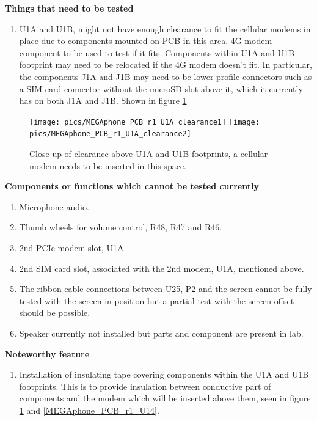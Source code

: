 \textbf{Things that need to be tested}
\begin{enumerate}
\item U1A and U1B, might not have enough clearance to fit the cellular modems in place due to components mounted on PCB in this area. 4G modem component to be used to test if it fits. Components within U1A and U1B footprint may need to be relocated if the 4G modem doesn't fit. In particular, the components J1A and J1B may need to be lower profile connectors such as a SIM card connector without the microSD slot above it, which it currently has on both J1A and J1B. Shown in figure \ref{MEGAphone_PCB_r1_U1A_clearance} \\
\end{enumerate}

\begin{figure} \begin{center}
\texttt{[image: pics/MEGAphone\_PCB\_r1\_U1A\_clearance1]}
\texttt{[image: pics/MEGAphone\_PCB\_r1\_U1A\_clearance2]}
\end{center} 
\caption{Close up of clearance above U1A and U1B footprints, a cellular modem needs to be inserted in this space. \\}
\label{MEGAphone_PCB_r1_U1A_clearance}
\end{figure}


\textbf{Components or functions which cannot be tested currently}
\begin{enumerate}
\item Microphone audio.
\item Thumb wheels for volume control, R48, R47 and R46.
\item 2nd PCIe modem slot, U1A.
\item 2nd SIM card slot, associated with the 2nd modem, U1A, mentioned above.
\item The ribbon cable connections between U25, P2 and the screen cannot be fully tested with the screen in position but a partial test with the screen offset should be possible.
\item Speaker currently not installed but parts and component are present in lab. \\
\end{enumerate}

\textbf{Noteworthy feature}
\begin{enumerate}
\item Installation of insulating tape covering components within the U1A and U1B footprints. This is to provide insulation between conductive part of components and the modem which will be inserted above them, seen in figure \ref{MEGAphone_PCB_r1_U1A_clearance} and \ref{MEGAphone_PCB_r1_U14}. \\
\end{enumerate}


